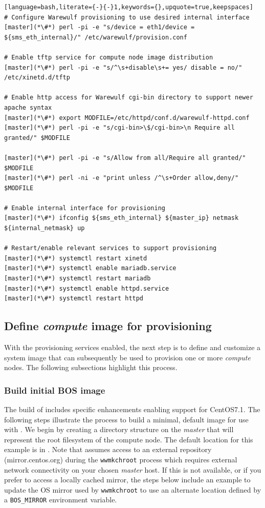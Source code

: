 \documentclass[letterpaper]{article}
\newcommand{\baseOS}{CentOS7.1}
\begin{document}
\begin{lstlisting}[language=bash,literate={-}{-}1,keywords={},upquote=true,keepspaces]
# Configure Warewulf provisioning to use desired internal interface
[master](*\#*) perl -pi -e "s/device = eth1/device = ${sms_eth_internal}/" /etc/warewulf/provision.conf

# Enable tftp service for compute node image distribution
[master](*\#*) perl -pi -e "s/^\s+disable\s+= yes/ disable = no/" /etc/xinetd.d/tftp

# Enable http access for Warewulf cgi-bin directory to support newer apache syntax
[master](*\#*) export MODFILE=/etc/httpd/conf.d/warewulf-httpd.conf
[master](*\#*) perl -pi -e "s/cgi-bin>\$/cgi-bin>\n Require all granted/" $MODFILE

[master](*\#*) perl -pi -e "s/Allow from all/Require all granted/" $MODFILE
[master](*\#*) perl -ni -e "print unless /^\s+Order allow,deny/" $MODFILE

# Enable internal interface for provisioning
[master](*\#*) ifconfig ${sms_eth_internal} ${master_ip} netmask ${internal_netmask} up

# Restart/enable relevant services to support provisioning
[master](*\#*) systemctl restart xinetd 
[master](*\#*) systemctl enable mariadb.service 
[master](*\#*) systemctl restart mariadb 
[master](*\#*) systemctl enable httpd.service 
[master](*\#*) systemctl restart httpd   
\end{lstlisting}


\subsection{Define {\em compute} image for provisioning}

With the provisioning services enabled, the next step is to define and
customize a system image that can subsequently be used to provision one or more
{\em compute} nodes. The following subsections highlight this process.

\subsubsection{Build initial BOS image} \label{sec:assemble_bos}

The \OHPC{} build of \Warewulf{} includes specific enhancements enabling support for
\baseOS{}. The following steps illustrate the process to build a minimal, default
image for use with \Warewulf{}.  We begin by creating a directory structure on the 
{\em master} that will represent the root filesystem of the compute node. The 
default location for this example is in
. Note that \Warewulf{} assumes access to
an external repository (mirror.centos.org) during the \texttt{wwmkchroot}
process which requires external network connectivity on your chosen {\em
  master} host. If this is not available, or if you prefer to access a locally cached
mirror, the steps below include an example to update the OS mirror used by
\texttt{wwmkchroot} to use an alternate location defined by a
\texttt{BOS\_MIRROR} environment variable.
\end{document}
